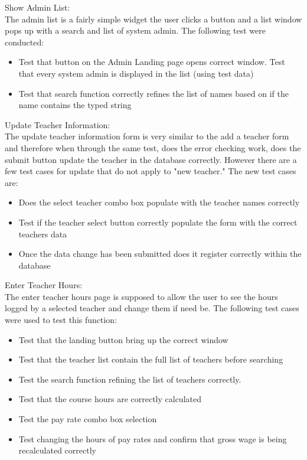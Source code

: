 Show Admin List:\\
The admin list is a fairly simple widget the user clicks a button and a list window pops up with a search and list of system admin. The following test were conducted:

\begin{itemize}
\item Test that button on the Admin Landing page opens correct window.
\itme Test that every system admin is displayed in the list (using test data)
\item Test that search function correctly refines the list of names based on if the name contains the typed string
\end{itemize}

Update Teacher Information:\\
The update teacher information form is very similar to the add a teacher form and therefore when through the same test, does the error checking work, does the submit button update the teacher in the database correctly. However there are a few test cases for update that do not apply to "new teacher." The new test cases are:

\begin{itemize}
\item Does the select teacher combo box populate with the teacher names correctly
\item Test if the teacher select button correctly populate the form with the correct teachers data
\item Once the data change has been submitted does it register correctly within the database
\end{itemize}

Enter Teacher Hours:\\
The enter teacher hours page is supposed to allow the user to see the hours logged by a selected teacher and change them if need be. The following test cases were used to test this function:

\begin{itemize}
\item Test that the landing button bring up the correct window
\item Test that the teacher list contain the full list of teachers before searching
\item Test the search function refining the list of teachers correctly.
\item Test that the course hours are correctly calculated
\item Test the pay rate combo box selection
\item Test changing the hours of pay rates and confirm that gross wage is being recalculated correctly
\end{itemize} 

